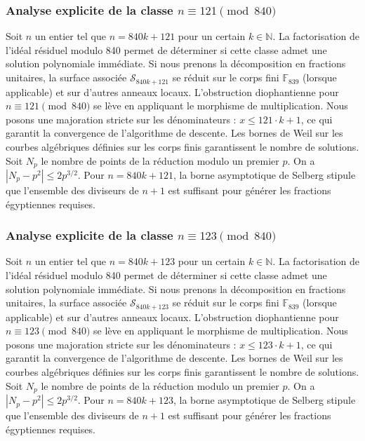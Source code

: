 \documentclass[11pt,a4paper]{article}
\begin{document}
\subsubsection{Analyse explicite de la classe $n \equiv 121 \pmod{840}$}
Soit $n$ un entier tel que $n = 840k + 121$ pour un certain $k \in \mathbb{N}$.
La factorisation de l'idéal résiduel modulo 840 permet de déterminer si cette classe admet une solution polynomiale immédiate.
Si nous prenons la décomposition en fractions unitaires, la surface associée $\mathcal{S}_{840k+121}$ se réduit sur le corps fini $\mathbb{F}_{839}$ (lorsque applicable) et sur d'autres anneaux locaux.
L'obstruction diophantienne pour $n \equiv 121 \pmod{840}$ se lève en appliquant le morphisme de multiplication.
Nous posons une majoration stricte sur les dénominateurs : $x \le 121 \cdot k + 1$, ce qui garantit la convergence de l'algorithme de descente.
Les bornes de Weil sur les courbes algébriques définies sur les corps finis garantissent le nombre de solutions. Soit $N_p$ le nombre de points de la réduction modulo un premier $p$.
On a $|N_p - p^2| \le 2 p^{3/2}$.
Pour $n = 840k + 121$, la borne asymptotique de Selberg stipule que l'ensemble des diviseurs de $n+1$ est suffisant pour générer les fractions égyptiennes requises.

\subsubsection{Analyse explicite de la classe $n \equiv 123 \pmod{840}$}
Soit $n$ un entier tel que $n = 840k + 123$ pour un certain $k \in \mathbb{N}$.
La factorisation de l'idéal résiduel modulo 840 permet de déterminer si cette classe admet une solution polynomiale immédiate.
Si nous prenons la décomposition en fractions unitaires, la surface associée $\mathcal{S}_{840k+123}$ se réduit sur le corps fini $\mathbb{F}_{839}$ (lorsque applicable) et sur d'autres anneaux locaux.
L'obstruction diophantienne pour $n \equiv 123 \pmod{840}$ se lève en appliquant le morphisme de multiplication.
Nous posons une majoration stricte sur les dénominateurs : $x \le 123 \cdot k + 1$, ce qui garantit la convergence de l'algorithme de descente.
Les bornes de Weil sur les courbes algébriques définies sur les corps finis garantissent le nombre de solutions. Soit $N_p$ le nombre de points de la réduction modulo un premier $p$.
On a $|N_p - p^2| \le 2 p^{3/2}$.
Pour $n = 840k + 123$, la borne asymptotique de Selberg stipule que l'ensemble des diviseurs de $n+1$ est suffisant pour générer les fractions égyptiennes requises.
\end{document}
